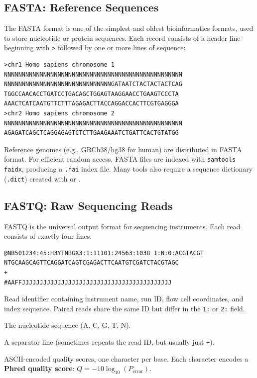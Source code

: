 \subsection{FASTA: Reference Sequences}
\label{subsec:bioinf:fasta}

The FASTA format is one of the simplest and oldest bioinformatics formats, used to store nucleotide or protein sequences. Each record consists of a header line beginning with \texttt{>} followed by one or more lines of sequence:

\begin{lstlisting}[caption={FASTA format example.},label=lst:fasta]
>chr1 Homo sapiens chromosome 1
NNNNNNNNNNNNNNNNNNNNNNNNNNNNNNNNNNNNNNNNNNNNNNNNNN
NNNNNNNNNNNNNNNNNNNNNNNNNNNNNNGATAATCTACTACTACTCAG
TGGCCAACACCTGATCCTGACAGCTGGAGTAAGGAACCTGAAGTCCCTA
AAACTCATCAATGTTCTTTAGAGACTTACCAGGACCACTTCGTGAGGGA
>chr2 Homo sapiens chromosome 2
NNNNNNNNNNNNNNNNNNNNNNNNNNNNNNNNNNNNNNNNNNNNNNNNNN
AGAGATCAGCTCAGGAGAGTCTCTTGAAGAAATCTGATTCACTGTATGG
\end{lstlisting}

Reference genomes (e.g., GRCh38/hg38 for human) are distributed in FASTA format. For efficient random access, FASTA files are indexed with \texttt{samtools faidx}, producing a \texttt{.fai} index file. Many tools also require a sequence dictionary (\texttt{.dict}) created with  or .

\subsection{FASTQ: Raw Sequencing Reads}
\label{subsec:bioinf:fastq}

FASTQ is the universal output format for sequencing instruments. Each read consists of exactly four lines:

\begin{lstlisting}[caption={FASTQ format example with Phred quality encoding.},label=lst:fastq]
@NB501234:45:H3YTNBGX3:1:11101:24563:1038 1:N:0:ACGTACGT
NTGCAAGCAGTTCAGGATCAGTCGAGACTTCAATGTCGATCTACGTAGC
+
#AAFFJJJJJJJJJJJJJJJJJJJJJJJJJJJJJJJJJJJJJJJJJJ
\end{lstlisting}

\begin{description}[style=nextline, font=\bfseries, itemsep=2pt]
  \item[Line 1 (@)] Read identifier containing instrument name, run ID, flow cell coordinates, and index sequence. Paired reads share the same ID but differ in the \texttt{1:} or \texttt{2:} field.
  \item[Line 2] The nucleotide sequence (A, C, G, T, N).
  \item[Line 3 (+)] A separator line (sometimes repeats the read ID, but usually just \texttt{+}).
  \item[Line 4] ASCII-encoded quality scores, one character per base. Each character encodes a \textbf{Phred quality score}: $Q = -10 \log_{10}(P_{\text{error}})$.
\end{description}

